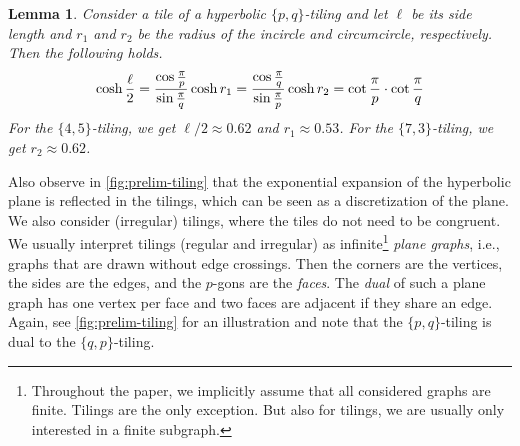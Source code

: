 \documentclass[11pt]{article}
\newtheorem{lemma}[theorem]{Lemma}
\begin{document}
\begin{lemma}
    \label{lem:distances-in-tilings}
    Consider a tile of a hyperbolic $\{p, q\}$-tiling and let $\ell$ be its side length and $r_1$ and $r_2$ be the radius of the incircle and circumcircle, respectively.
    Then the following holds.
    \begin{equation*}
        \cosh \frac{\ell}{2} = \frac{\cos \frac{\pi}{p}}{\sin \frac{\pi}{q}}
        \hfill
        \cosh r_1 = \frac{\cos \frac{\pi}{q}}{\sin \frac{\pi}{p}}
        \hfill
        \cosh r_2 = \cot \frac{\pi}{p} \cdot \cot \frac{\pi}{q}
        \hfill
    \end{equation*}
    For the $\{4, 5\}$-tiling, we get $\ell / 2 \approx 0.62$ and $r_1 \approx 0.53$.
    For the $\{7, 3\}$-tiling, we get $r_2 \approx 0.62$.
\end{lemma}
%
Also observe in \cref{fig:prelim-tiling} that the exponential expansion of the hyperbolic plane is reflected in the tilings, which can be seen as a discretization of the plane.
We also consider (irregular) tilings, where the tiles do not need to be congruent.
%
We usually interpret tilings (regular and irregular) as infinite\footnote{Throughout the paper, we implicitly assume that all considered graphs are finite.
  Tilings are the only exception.
  But also for tilings, we are usually only interested in a finite subgraph.} \emph{plane graphs}, i.e., graphs that are drawn without edge crossings.
Then the corners are the vertices, the sides are the edges, and the $p$-gons are the \emph{faces}.
The \emph{dual} of such a plane graph has one vertex per face and two faces are adjacent if they share an edge.
Again, see \cref{fig:prelim-tiling} for an illustration and note that the $\{p, q\}$-tiling is dual to the $\{q, p\}$-tiling.
%
\end{document}
